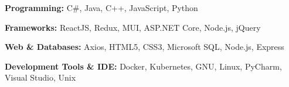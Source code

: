 \begin{onecolentry}
    \textbf{Programming:} C\#, Java, C++, JavaScript, Python
\end{onecolentry}
\vspace{0.1 cm}
\begin{onecolentry}
    \textbf{Frameworks:} ReactJS, Redux, MUI, ASP.NET Core, Node.js, jQuery
\end{onecolentry}
\vspace{0.1 cm}
\begin{onecolentry}
    \textbf{Web \& Databases:} Axios, HTML5, CSS3, Microsoft SQL, Node.js, Express
\end{onecolentry}

\vspace{0.1 cm}
\begin{onecolentry}
    \textbf{Development Tools \& IDE:} Docker, Kubernetes, GNU, Linux, PyCharm, Visual Studio, Unix
\end{onecolentry}
